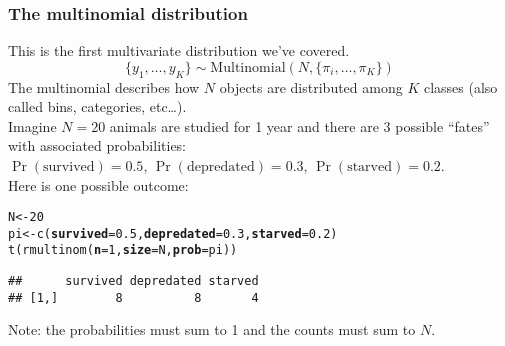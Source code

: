 \documentclass[color=usenames,dvipsnames]{beamer}\usepackage[]{graphicx}\usepackage[]{xcolor}
\makeatletter
\newcommand{\hlnum}[1]{\textcolor[rgb]{0.69,0.494,0}{#1}}%
\newcommand{\hldef}[1]{\textcolor[rgb]{0,0,0}{#1}}%
\newcommand{\hlkwb}[1]{\textcolor[rgb]{0,0.341,0.682}{#1}}%
\newcommand{\hlkwc}[1]{\textcolor[rgb]{0,0,0}{\textbf{#1}}}%
\newcommand{\hlkwd}[1]{\textcolor[rgb]{0.004,0.004,0.506}{#1}}%
\newenvironment{kframe}{%
 \def\at@end@of@kframe{}%
 \ifinner\ifhmode%
  \def\at@end@of@kframe{\end{minipage}}%
  \begin{minipage}{\columnwidth}%
 \fi\fi%
 \def\FrameCommand##1{\hskip\@totalleftmargin \hskip-\fboxsep
 \colorbox{shadecolor}{##1}\hskip-\fboxsep
     \hskip-\linewidth \hskip-\@totalleftmargin \hskip\columnwidth}%
 \MakeFramed {\advance\hsize-\width
   \@totalleftmargin\z@ \linewidth\hsize
   \@setminipage}}%
 {\par\unskip\endMakeFramed%
 \at@end@of@kframe}
\newenvironment{knitrout}{}{} %
\makeatother
\begin{document}
\begin{frame}[fragile]
  \frametitle{The multinomial distribution}
  \small
  This is the first multivariate distribution we've covered. \\
  \[
    \{y_{1}, \dots, y_{K}\}  \sim \mathrm{Multinomial}(N, \{\pi_i, \dots, \pi_K\})
  \]
  \pause
  The multinomial describes how $N$ objects are distributed among
  $K$ classes (also called bins, categories, etc\dots). \\
  \pause
  \vfill
  Imagine $N=20$ animals are studied for 1 year and there are 3
  possible ``fates'' with associated probabilities: \\
  $\Pr(\mathrm{survived})=0.5$, $\Pr(\mathrm{depredated})=0.3$, $\Pr(\mathrm{starved})=0.2$. \\
  \pause
  \vfill
  Here is one possible outcome:
  \vspace{-6pt}
\begin{knitrout}\footnotesize
{}\color{fgcolor}\begin{kframe}
\begin{alltt}
\hldef{N} \hlkwb{<-} \hlnum{20}
\hldef{pi} \hlkwb{<-} \hlkwd{c}\hldef{(}\hlkwc{survived}\hldef{=}\hlnum{0.5}\hldef{,} \hlkwc{depredated}\hldef{=}\hlnum{0.3}\hldef{,} \hlkwc{starved}\hldef{=}\hlnum{0.2}\hldef{)}
\hlkwd{t}\hldef{(}\hlkwd{rmultinom}\hldef{(}\hlkwc{n}\hldef{=}\hlnum{1}\hldef{,} \hlkwc{size}\hldef{=N,} \hlkwc{prob}\hldef{=pi))}
\end{alltt}
\begin{verbatim}
##      survived depredated starved
## [1,]        8          8       4
\end{verbatim}
\end{kframe}
\end{knitrout}
  \pause
  \centering
  Note: the probabilities must sum to 1 and the counts must sum to $N$. \\
\end{frame}



\end{document}
